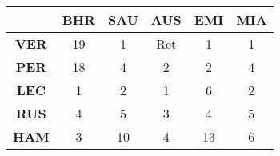 \begin{table}[htbp]
\centering
\begin{tabular}{|cccccc|}
 \hline
 {} & \textbf{BHR} & \textbf{SAU} & \textbf{AUS} & \textbf{EMI} & \textbf{MIA}  \\ [0.2ex]
 \hline
 \textbf{VER} & 19 & 1  & Ret & 1  & 1    \\
 \hline
 \textbf{PER} & 18 & 4  & 2   & 2  & 4   \\
 \hline
 \textbf{LEC} & 1  & 2  & 1   & 6  & 2  \\
 \hline
 \textbf{RUS} & 4  & 5  & 3   & 4  & 5    \\
 \hline
 \textbf{HAM} & 3  & 10 & 4   & 13 & 6  \\
 \hline
\end{tabular}
\label{tab:f1_results}
\end{table}
